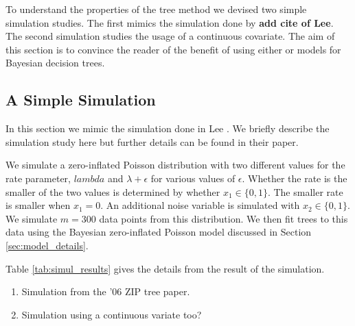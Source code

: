 

To understand the properties of the tree method we devised two simple simulation studies. The first mimics the simulation done by \textbf{add cite of Lee}. The second simulation studies the usage of a continuous covariate. The aim of this section is to convince the reader of the benefit of using either \ZIP or \ZINB models for Bayesian decision trees. 

\subsection{A Simple Simulation}

In this section we mimic the simulation done in Lee \cite{lee2006decision}.
We briefly describe the simulation study here but further details can be found in their paper. 

We simulate a zero-inflated Poisson distribution with two different values for the rate parameter, $lambda$ and $\lambda+\epsilon$ for various values of $\epsilon$. Whether the rate is the smaller of the two values is determined by whether $x_1 \in \{0,1\}$. The smaller rate is smaller when $x_1=0$. An additional noise variable is simulated with $x_2 \in \{0,1\}$. We simulate $m=300$ data points from this distribution. We then fit trees to this data using the Bayesian zero-inflated Poisson model discussed in Section \ref{sec:model_details}. 

Table \ref{tab:simul_results} gives the details from the result of the simulation. 
 
\begin{enumerate}
\item Simulation from the '06 ZIP tree paper. 
\item Simulation using a continuous variate too? 
\end{enumerate}


